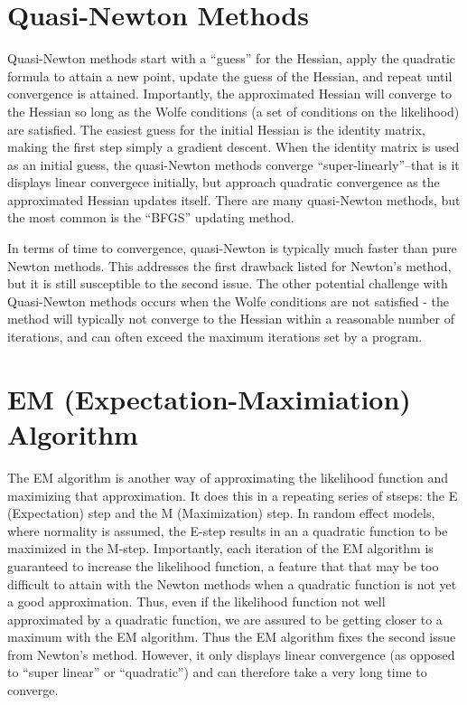 \documentclass[
  letterpaper,
  DIV=11,
  numbers=noendperiod]{scrreprt}
\begin{document}
\section{Quasi-Newton Methods}\label{quasi-newton-methods}

Quasi-Newton methods start with a ``guess'' for the Hessian, apply the
quadratic formula to attain a new point, update the guess of the
Hessian, and repeat until convergence is attained. Importantly, the
approximated Hessian will converge to the Hessian so long as the Wolfe
conditions (a set of conditions on the likelihood) are satisfied. The
easiest guess for the initial Hessian is the identity matrix, making the
first step simply a gradient descent. When the identity matrix is used
as an initial guess, the quasi-Newton methods converge
``super-linearly''--that is it displays linear convergece initially, but
approach quadratic convergence as the approximated Hessian updates
itself. There are many quasi-Newton methods, but the most common is the
``BFGS'' updating method.

In terms of time to convergence, quasi-Newton is typically much faster
than pure Newton methods. This addresses the first drawback listed for
Newton's method, but it is still susceptible to the second issue. The
other potential challenge with Quasi-Newton methods occurs when the
Wolfe conditions are not satisfied - the method will typically not
converge to the Hessian within a reasonable number of iterations, and
can often exceed the maximum iterations set by a program.

\section{EM (Expectation-Maximiation)
Algorithm}\label{em-expectation-maximiation-algorithm}

The EM algorithm is another way of approximating the likelihood function
and maximizing that approximation. It does this in a repeating series of
stseps: the E (Expectation) step and the M (Maximization) step. In
random effect models, where normality is assumed, the E-step results in
an a quadratic function to be maximized in the M-step. Importantly, each
iteration of the EM algorithm is guaranteed to increase the likelihood
function, a feature that that may be too difficult to attain with the
Newton methods when a quadratic function is not yet a good
approximation. Thus, even if the likelihood function not well
approximated by a quadratic function, we are assured to be getting
closer to a maximum with the EM algorithm. Thus the EM algorithm fixes
the second issue from Newton's method. However, it only displays linear
convergence (as opposed to ``super linear'' or ``quadratic'') and can
therefore take a very long time to converge.
\end{document}
